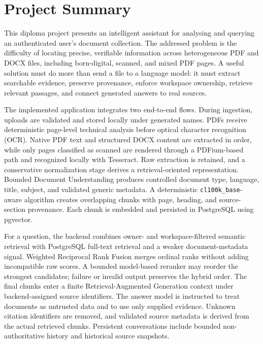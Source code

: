 \chapter*{Project Summary}

This diploma project presents an intelligent assistant for analysing and querying an authenticated user's document collection. The addressed problem is the difficulty of locating precise, verifiable information across heterogeneous PDF and DOCX files, including born-digital, scanned, and mixed PDF pages. A useful solution must do more than send a file to a language model: it must extract searchable evidence, preserve provenance, enforce workspace ownership, retrieve relevant passages, and connect generated answers to real sources.

The implemented application integrates two end-to-end flows. During ingestion, uploads are validated and stored locally under generated names. PDFs receive deterministic page-level technical analysis before optical character recognition (OCR). Native PDF text and structured DOCX content are extracted in order, while only pages classified as scanned are rendered through a PDFium-based path and recognized locally with Tesseract. Raw extraction is retained, and a conservative normalization stage derives a retrieval-oriented representation. Bounded Document Understanding produces controlled document type, language, title, subject, and validated generic metadata. A deterministic \texttt{cl100k\_base}-aware algorithm creates overlapping chunks with page, heading, and source-section provenance. Each chunk is embedded and persisted in PostgreSQL using pgvector.

For a question, the backend combines owner- and workspace-filtered semantic retrieval with PostgreSQL full-text retrieval and a weaker document-metadata signal. Weighted Reciprocal Rank Fusion merges ordinal ranks without adding incompatible raw scores. A bounded model-based reranker may reorder the strongest candidates; failure or invalid output preserves the hybrid order. The final chunks enter a finite Retrieval-Augmented Generation context under backend-assigned source identifiers. The answer model is instructed to treat documents as untrusted data and to use only supplied evidence. Unknown citation identifiers are removed, and validated source metadata is derived from the actual retrieved chunks. Persistent conversations include bounded non-authoritative history and historical source snapshots.

